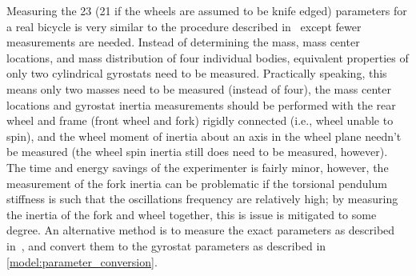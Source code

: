 Measuring the 23 (21 if the wheels are assumed to be knife edged) parameters
for a real bicycle is very similar to the procedure described
in~\cite{Moore2010b} except fewer measurements are needed. Instead of
determining the mass, mass center locations, and mass distribution of four
individual bodies, equivalent properties of only two cylindrical gyrostats need
to be measured. Practically speaking, this means only two masses need to be
measured (instead of four), the mass center locations and gyrostat inertia
measurements should be performed with the rear wheel and frame (front wheel and
fork) rigidly connected (i.e., wheel unable to spin), and the wheel moment of
inertia about an axis in the wheel plane needn't be measured (the wheel spin
inertia still does need to be measured, however). The time and energy savings
of the experimenter is fairly minor, however, the measurement of the fork
inertia can be problematic if the torsional pendulum stiffness is such that the
oscillations frequency are relatively high; by measuring the inertia of the
fork and wheel together, this is issue is mitigated to some degree. An
alternative method is to measure the exact parameters as described
in~\cite{Moore2010b}, and convert them to the gyrostat parameters as described
in \autoref{model:parameter_conversion}.

